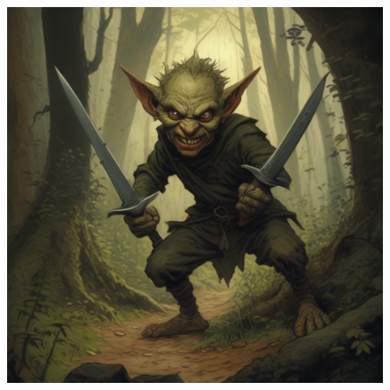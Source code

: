 

\begin{figure}[h]
\begin{center}
\includegraphics[scale=0.24]{img/ai-images/goblin.png}
\end{center}
\end{figure}

